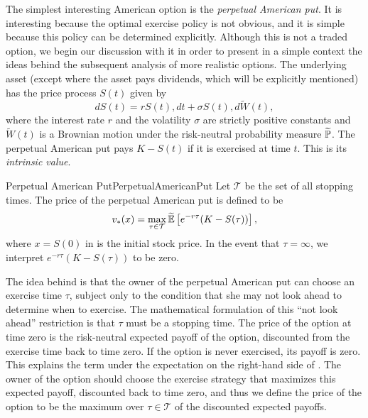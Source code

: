 The simplest interesting American option is the \textit{perpetual American put}. It is interesting because the optimal exercise policy is not obvious, and it is simple because this policy can be determined explicitly. Although this is not a traded option, we begin our discussion with it in order to present in a simple context the ideas behind the subsequent analysis of more realistic options.
The underlying asset (except where the asset pays dividends, which will be explicitly mentioned) has the price process $S(t)$ given by
\begin{equation}
	\label{eq:GBMRiskNeutral}
	dS(t) = rS(t) , dt + \sigma S(t) , d\widetilde{W}(t),
\end{equation}
where the interest rate $r$ and the volatility $\sigma$ are strictly positive constants and $\widetilde{W}(t)$ is a Brownian motion under the risk-neutral probability measure $\widetilde{\mathbb{P}}$. The perpetual American put pays $K - S(t)$ if it is exercised at time $t$. This is its \textit{intrinsic value}.

\begin{defn}{Perpetual American Put}{PerpetualAmericanPut}
	Let $\mathcal{T}$ be the set of all stopping times. The price of the perpetual American put is defined to be
	\begin{equation}
		\label{eq:PerpetualAmericanPutPrice}
		v_*(x) = \max_{\tau \in \mathcal{T}} \widetilde{\mathbb{E}} \left[ e^{-r\tau} (K - S(\tau)) \right],
	\end{equation}
	where $x = S(0)$ in  is the initial stock price. In the event that $\tau = \infty$, we interpret $e^{-r\tau}(K - S(\tau))$ to be zero.
\end{defn}

The idea behind  is that the owner of the perpetual American put can choose an exercise time $\tau$, subject only to the condition that she may not look ahead to determine when to exercise. The mathematical formulation of this ``not look ahead'' restriction is that $\tau$ must be a stopping time. The price of the option at time zero is the risk-neutral expected payoff of the option, discounted from the exercise time back to time zero. If the option is never exercised, its payoff is zero. This explains the term under the expectation on the right-hand side of . The owner of the option should choose the exercise strategy that maximizes this expected payoff, discounted back to time zero, and thus we define the price of the option to be the maximum over $\tau \in \mathcal{T}$ of the discounted expected payoffs.

